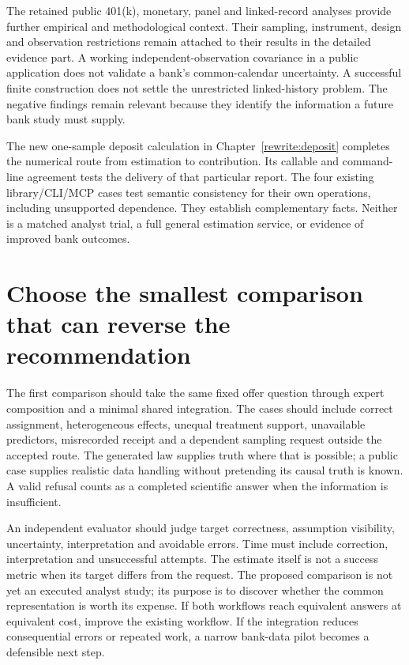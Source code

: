 The retained public 401(k), monetary, panel and linked-record analyses
provide further empirical and methodological context. Their sampling,
instrument, design and observation restrictions remain attached to their
results in the detailed evidence part. A working independent-observation
covariance in a public application does not validate a bank's common-calendar
uncertainty. A successful finite construction does not settle the unrestricted
linked-history problem. The negative findings remain relevant because
they identify the information a future bank study must supply.

The new one-sample deposit calculation in Chapter~\ref{rewrite:deposit}
completes the numerical route from estimation to contribution. Its callable
and command-line agreement tests the delivery of that particular report.
The four existing library/CLI/MCP cases test semantic consistency for
their own operations, including unsupported dependence. They establish
complementary facts. Neither is a matched analyst trial, a full general
estimation service, or evidence of improved bank outcomes.

\section{Choose the smallest comparison that can reverse the recommendation}
The first comparison should take the same fixed offer question through
expert composition and a minimal shared integration. The cases should
include correct assignment, heterogeneous effects, unequal treatment
support, unavailable predictors, misrecorded receipt and a dependent
sampling request outside the accepted route. The generated law supplies
truth where that is possible; a public case supplies realistic data handling
without pretending its causal truth is known. A valid refusal counts as
a completed scientific answer when the information is insufficient.

An independent evaluator should judge target correctness, assumption
visibility, uncertainty, interpretation and avoidable errors. Time must
include correction, interpretation and unsuccessful attempts. The estimate
itself is not a success metric when its target differs from the request.
The proposed comparison is not yet an executed analyst study; its purpose
is to discover whether the common representation is worth its expense.
If both workflows reach equivalent answers at equivalent cost, improve
the existing workflow. If the integration reduces consequential errors or
repeated work, a narrow bank-data pilot becomes a defensible next step.

